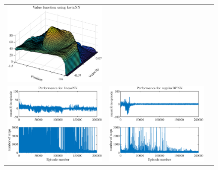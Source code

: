 \documentclass[preprint,12pt,authoryear]{elsarticle}
\begin{document}
\begin{figure}
\begin{center}
\begin{tabular}[h]{ccc}
\includegraphics[scale=0.2]{figures/mountainCar-kwtaNN-cost.eps} \\
\includegraphics[scale=0.2]{figures/mountainCar-linearNN-performance.eps} &
\includegraphics[scale=0.2]{figures/mountainCar-regularBPNN-performance.eps} & 

\end{tabular}
\end{center}
\end{figure}
\end{document}
